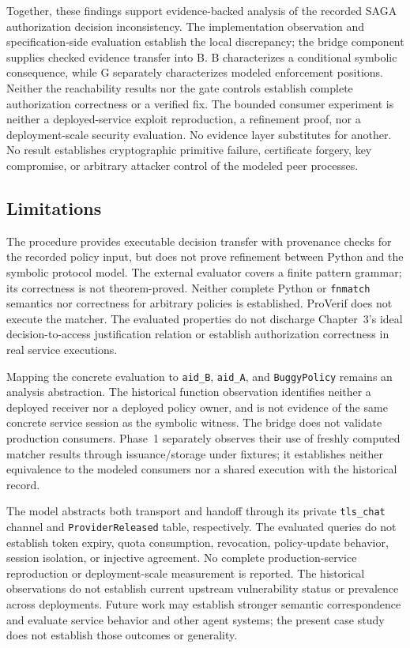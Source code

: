 Together, these findings support evidence-backed analysis of the recorded
SAGA authorization decision inconsistency. The implementation observation
and specification-side evaluation establish the local discrepancy; the bridge
component supplies checked evidence transfer into B. B characterizes a
conditional symbolic consequence, while G separately characterizes modeled
enforcement positions. Neither the reachability results nor the gate controls
establish complete authorization correctness or a verified fix. The bounded
consumer experiment is neither a deployed-service exploit reproduction,
a refinement proof, nor a deployment-scale security evaluation. No evidence layer substitutes for
another. No result
establishes cryptographic primitive failure, certificate forgery, key
compromise, or arbitrary attacker control of the modeled peer processes.

\subsection{Limitations}

The procedure provides executable decision transfer with provenance checks
for the recorded policy input, but does not prove refinement between Python
and the symbolic protocol model. The external evaluator covers a finite
pattern grammar; its correctness is not theorem-proved. Neither complete
Python or \texttt{fnmatch} semantics nor correctness for arbitrary policies
is established. ProVerif does not execute the matcher. The evaluated
properties do not discharge Chapter~3's ideal decision-to-access justification
relation or establish authorization correctness in real service executions.

Mapping the concrete evaluation to \texttt{aid\_B}, \texttt{aid\_A}, and
\texttt{BuggyPolicy} remains an analysis abstraction. The historical
function observation identifies neither a deployed receiver nor a deployed
policy owner, and is not evidence of the same concrete service session as
the symbolic witness. The bridge does not validate production consumers.
Phase~1 separately observes their use of freshly computed matcher results
through issuance/storage under fixtures; it establishes neither equivalence
to the modeled consumers nor a shared execution with the historical record.

The model abstracts both transport and handoff through its private
\texttt{tls\_chat} channel and \texttt{ProviderReleased} table, respectively.
The evaluated queries do not
establish token expiry, quota
consumption, revocation, policy-update behavior, session isolation, or
injective agreement. No complete production-service reproduction or
deployment-scale measurement is reported. The historical observations do
not establish current upstream vulnerability status or prevalence across
deployments. Future work may establish stronger semantic correspondence
and evaluate service behavior and other agent systems; the present
case study does not establish those outcomes or generality.
